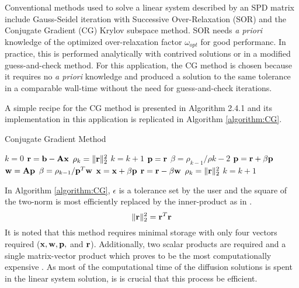     Conventional methods used to solve a linear system described by an SPD
    matrix include Gauss-Seidel iteration with Successive Over-Relaxation (SOR) 
    and the Conjugate Gradient (CG) Krylov subspace method. SOR needs
    \textit{a priori} knowledge of the optimized over-relaxation factor
    $\omega_{opt}$ for good performanc. In practice, this is performed 
    analytically with contrived solutions or in a modified guess-and-check 
    method. For this application, the CG method is chosen because it requires no 
    \textit{a priori} knowledge and produced a solution to the same tolerance in 
    a comparable wall-time without the need for guess-and-check iterations.
    
    A simple recipe for the CG method is presented in Algorithm 2.4.1
    \cite{Kelley1995IterativeEquations} and its implementation in this 
    application is replicated in Algorithm \ref{algorithm:CG}.
    
    \begin{algorithm}
      \caption{Conjugate Gradient Method}
      \label{algorithm:CG}
      \begin{algorithmic}[1]
        \State $k = 0$
        \State $\mathbf{r} = \mathbf{b} - \mathbf{A} \mathbf{x}$
        \State $\rho_k = \|\mathbf{r}\|_2^2$
        \State $k = k + 1$
            \State $\mathbf{p} = \mathbf{r}$
          \Else
            \State $\beta = \rho_{k-1} / \rho{k-2}$
            \State $\mathbf{p} = \mathbf{r} + \beta \mathbf{p}$
          \EndIf
          \State $\mathbf{w} = \mathbf{A} \mathbf{p}$
          \State $\beta = \rho_{k-1} / \mathbf{p}^{T} \mathbf{w}$
          \State $\mathbf{x} = \mathbf{x} + \beta \mathbf{p}$
          \State $\mathbf{r} = \mathbf{r} - \beta \mathbf{w}$
          \State $\rho_k = \| \mathbf{r} \|_2^2$
          \State $k=k+1$
        \EndWhile
      \end{algorithmic}
    \end{algorithm}
    
    In Algorithm \ref{algorithm:CG}, $\epsilon$ is a tolerance set by the user 
    and the square of the two-norm is most efficiently replaced by the 
    inner-product as in . 
    \begin{equation}
      \label{eq:two_norm_inner}
      \|\mathbf{r}\|_2^2 = \mathbf{r}^{T} \mathbf{r}
    \end{equation}
    It is noted that this method requires minimal storage with only four vectors 
    required ($\mathbf{x}, \mathbf{w}, \mathbf{p},$ and $\mathbf{r}$). Additionally, two scalar products 
    are required and a single matrix-vector product which proves to be the most 
    computationally expensive \cite{Kelley1995IterativeEquations}. As most of 
    the computational time of the diffusion solutions is spent in the linear 
    system solution, is is crucial that this process be efficient.
